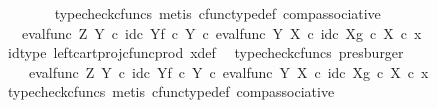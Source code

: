 \begin{isabellebody}
\ \ \ \ \ \ \isamarkupfalse%
\ {\isacharparenleft}{\kern0pt}typecheck{\isacharunderscore}{\kern0pt}cfuncs{\isacharcomma}{\kern0pt}\ metis\ cfunc{\isacharunderscore}{\kern0pt}type{\isacharunderscore}{\kern0pt}def\ comp{\isacharunderscore}{\kern0pt}associative{\isacharparenright}{\kern0pt}\isanewline
\ \ \ \ \isamarkupfalse%
\ \isamarkupfalse%
\ {\isachardoublequoteopen}{\isachardot}{\kern0pt}{\isachardot}{\kern0pt}{\isachardot}{\kern0pt}\ {\isacharequal}{\kern0pt}\ {\isacharparenleft}{\kern0pt}{\isacharparenleft}{\kern0pt}eval{\isacharunderscore}{\kern0pt}func\ Z\ Y\ {\isasymcirc}\isactrlsub c\ {\isasymlangle}id\isactrlsub c\ Y{\isacharcomma}{\kern0pt}f\ {\isasymcirc}\isactrlsub c\ {\isasymbeta}\isactrlbsub Y\isactrlesub {\isasymrangle}{\isacharparenright}{\kern0pt}\ {\isasymcirc}\isactrlsub c\ eval{\isacharunderscore}{\kern0pt}func\ Y\ X\ {\isasymcirc}\isactrlsub c\ {\isasymlangle}id\isactrlsub c\ X{\isacharcomma}{\kern0pt}g\ {\isasymcirc}\isactrlsub c\ {\isasymbeta}\isactrlbsub X\isactrlesub {\isasymrangle}{\isacharparenright}{\kern0pt}\ {\isasymcirc}\isactrlsub c\ x{\isachardoublequoteclose}\isanewline
\ \ \ \ \ \ \isamarkupfalse%
\ id{\isacharunderscore}{\kern0pt}type\ left{\isacharunderscore}{\kern0pt}cart{\isacharunderscore}{\kern0pt}proj{\isacharunderscore}{\kern0pt}cfunc{\isacharunderscore}{\kern0pt}prod\ x{\isacharunderscore}{\kern0pt}def\ \isamarkupfalse%
\ {\isacharparenleft}{\kern0pt}typecheck{\isacharunderscore}{\kern0pt}cfuncs{\isacharcomma}{\kern0pt}\ presburger{\isacharparenright}{\kern0pt}\isanewline
\ \ \ \ \isamarkupfalse%
\ \isamarkupfalse%
\ {\isachardoublequoteopen}{\isachardot}{\kern0pt}{\isachardot}{\kern0pt}{\isachardot}{\kern0pt}\ {\isacharequal}{\kern0pt}\ \ {\isacharparenleft}{\kern0pt}eval{\isacharunderscore}{\kern0pt}func\ Z\ Y\ {\isasymcirc}\isactrlsub c\ {\isasymlangle}id\isactrlsub c\ Y{\isacharcomma}{\kern0pt}f\ {\isasymcirc}\isactrlsub c\ {\isasymbeta}\isactrlbsub Y\isactrlesub {\isasymrangle}{\isacharparenright}{\kern0pt}\ {\isasymcirc}\isactrlsub c\ eval{\isacharunderscore}{\kern0pt}func\ Y\ X\ {\isasymcirc}\isactrlsub c\ {\isasymlangle}id\isactrlsub c\ X{\isacharcomma}{\kern0pt}g\ {\isasymcirc}\isactrlsub c\ {\isasymbeta}\isactrlbsub X\isactrlesub {\isasymrangle}\ {\isasymcirc}\isactrlsub c\ x{\isachardoublequoteclose}\isanewline
\ \ \ \ \ \ \isamarkupfalse%
\ {\isacharparenleft}{\kern0pt}typecheck{\isacharunderscore}{\kern0pt}cfuncs{\isacharcomma}{\kern0pt}\ metis\ cfunc{\isacharunderscore}{\kern0pt}type{\isacharunderscore}{\kern0pt}def\ comp{\isacharunderscore}{\kern0pt}associative{\isacharparenright}{\kern0pt}\isanewline

\end{isabellebody}
